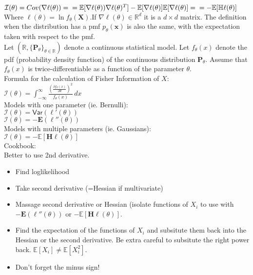 $\mathcal{I}(\theta) = Cov(\nabla \ell(\theta)) = \\ = \mathbb{E}[\nabla \ell(\theta))\nabla\ell(\theta)^T] -  \mathbb{E}[\nabla \ell(\theta)]\mathbb{E}[\nabla \ell(\theta)] =\\ = -\mathbb{E}[\mathbb{H}\ell(\theta)]$\\

Where $\ell (\theta ) = \ln f_\theta (\mathbf X)$.If $\nabla\ell(\theta) \in \mathbb{R}^d$ it is a $d \times d$ matrix. The definition when the distribution has a pmf $p_\theta (\mathbf x)$ is also the same, with the expectation taken with respect to the pmf.\\

Let $(\mathbb {R}, \{ \mathbf{P}_\theta \} _{\theta \in \mathbb {R}})$ denote a continuous statistical model. Let $f_\theta (x)$ denote the pdf (probability density function) of the continuous distribution $\mathbf{P}_\theta$. Assume that $f_\theta (x)$ is twice-differentiable as a function of the parameter $\theta$.\\

Formula for the calculation of Fisher Information of $X$:\\

$\mathcal{I}(\theta )= \int _{-\infty }^\infty \frac{\left(\frac{\partial f_\theta (x)}{\partial \theta }\right)^2}{f_\theta (x)} \,  dx$ \\

Models with one parameter (ie. Bernulli):\\

$\mathcal{I}(\theta ) = \textsf{Var}(\ell '(\theta ))$\\

$\mathcal{I}(\theta ) = - \mathbf{E}(\ell ''(\theta ))$\\

Models with multiple parameters (ie. Gaussians):\\

$\mathcal{I}(\theta ) = -\mathbb E\left[\mathbf{H}\ell (\theta )\right]$\\

Cookbook:\\

Better to use 2nd derivative.\\

\begin{itemize}
  \item Find loglikelihood
  \item Take second derivative (=Hessian if multivariate)
  \item Massage second derivative or Hessian (isolate functions of $X_i$ to use with $- \mathbf{E}(\ell ''(\theta ))$ or $-\mathbb E\left[\mathbf{H}\ell (\theta )\right]$.
  \item Find the expectation of the functions of $X_i$ and subsitute them back into the Hessian or the second derivative. Be extra careful to subsitute the right power back. $\mathbb{E}[X_i] \neq \mathbb{E}[X_i^2]$.
  \item Don't forget the minus sign!
\end{itemize}

